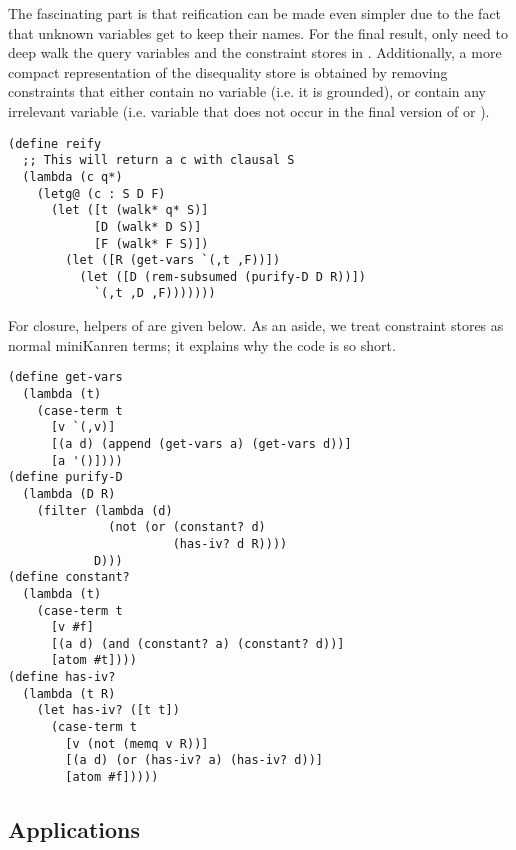 The fascinating part is that reification can be made even simpler due to the fact that unknown variables get to keep their names. For the final result,  only need to deep walk the query variables and the constraint stores in . Additionally, a more compact representation of the disequality store is obtained by removing constraints that either contain no variable (i.e. it is grounded), or contain any irrelevant variable (i.e. variable that does not occur in the final version of  or ).
\begin{lstlisting}
(define reify
  ;; This will return a c with clausal S
  (lambda (c q*)
    (letg@ (c : S D F)
      (let ([t (walk* q* S)]
            [D (walk* D S)]
            [F (walk* F S)])
        (let ([R (get-vars `(,t ,F))])
          (let ([D (rem-subsumed (purify-D D R))])
            `(,t ,D ,F)))))))
\end{lstlisting}

For closure, helpers of  are given below. As an aside, we treat constraint stores as normal miniKanren terms; it explains why the code is so short.
\begin{lstlisting}
(define get-vars
  (lambda (t)
    (case-term t
      [v `(,v)]
      [(a d) (append (get-vars a) (get-vars d))]
      [a '()])))
(define purify-D
  (lambda (D R)
    (filter (lambda (d)
              (not (or (constant? d)
                       (has-iv? d R))))
            D)))
(define constant?
  (lambda (t)
    (case-term t
      [v #f]
      [(a d) (and (constant? a) (constant? d))]
      [atom #t])))
(define has-iv?
  (lambda (t R)
    (let has-iv? ([t t])
      (case-term t
        [v (not (memq v R))]
        [(a d) (or (has-iv? a) (has-iv? d))]
        [atom #f]))))
\end{lstlisting}

\subsection{Applications}
